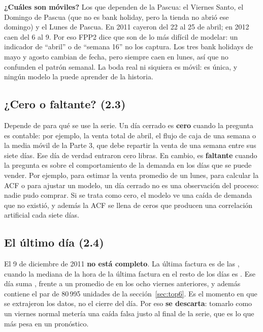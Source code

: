 \documentclass[11pt,letterpaper]{article}
\newenvironment{respuesta}{\par\medskip}{\par\medskip}
\begin{document}
\begin{respuesta}
\textbf{¿Cuáles son móviles?} Los que dependen de la Pascua: el Viernes
Santo, el Domingo de Pascua (que no es bank holiday, pero la tienda no abrió
ese domingo) y el Lunes de Pascua. En 2011 cayeron del 22 al 25 de abril; en
2012 caen del 6 al 9. Por eso FPP2 dice que son de lo más difícil de modelar:
un indicador de ``abril'' o de ``semana 16'' no los captura. Los tres bank
holidays de mayo y agosto cambian de fecha, pero siempre caen en lunes, así
que no confunden el patrón semanal. La boda real ni siquiera es móvil: es
única, y ningún modelo la puede aprender de la historia.
\end{respuesta}

\subsection{¿Cero o faltante? (2.3)}

Depende de para qué se use la serie. Un día cerrado es \textbf{cero} cuando
la pregunta es contable: por ejemplo, la venta total de abril, el flujo de
caja de una semana o la media móvil de la Parte 3, que debe repartir la
venta de una semana entre sus siete días. Ese día de verdad entraron cero
libras. En cambio, es \textbf{faltante} cuando la pregunta es sobre el
comportamiento de la demanda en los días que se puede vender. Por ejemplo,
para estimar la venta promedio de un lunes, para calcular la ACF o para
ajustar un modelo, un día cerrado no es una observación del proceso: nadie
pudo comprar. Si se trata como cero, el modelo ve una caída de demanda que no
existió, y además la ACF se llena de ceros que producen una correlación
artificial cada siete días.

\subsection{El último día (2.4)}

El 9 de diciembre de 2011 \textbf{no está completo}. La última factura es de
las \UltimaHora, cuando la mediana de la hora de la última factura en el resto
de los días es \HoraCierreMediana. Ese día suma \VentaUltimoDia, frente a un
promedio de \VentaViernesPrevios{} en los ocho viernes anteriores, y además
contiene el par de 80\,995 unidades de la sección~\ref{sec:top6}. Es el
momento en que se extrajeron los datos, no el cierre del día. Por eso
\textbf{se descarta}: tomarlo como un viernes normal metería una caída
falsa justo al final de la serie, que es lo que más pesa en un pronóstico.
\end{document}
